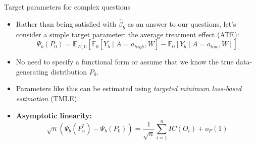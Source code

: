 \documentclass[12pt,t,handout]{beamer}
\begin{document}
\begin{frame}[c]{Target parameters for complex questions}

\begin{center}
\begin{itemize}
  \itemsep12pt
  \item Rather than being satisfied with $\hat{\beta}_{b}$ as an answer to our
    questions, let's consider a simple target parameter: the average treatment
    effect (ATE):
    \[
      \Psi_b(P_0) = \mathbb{E}_{W,0}[\mathbb{E}_0[Y_b \mid A = a_{high}, W] -
      \mathbb{E}_0[Y_b \mid A = a_{low}, W]]
    \]
  \item No need to specify a functional form or assume that we know the true
    data-generating distribution $P_0$.
  \item Parameters like this can be estimated using \textit{targeted minimum
    loss-based estimation} (TMLE).
  \item \textbf{Asymptotic linearity:}
    \[
      \sqrt{n}(\Psi_b(P_n^*) - \Psi_b(P_0)) = \frac{1}{\sqrt{n}}
      \sum_{i = 1}^{n} IC(O_i) + o_P(1)
    \]
\end{itemize}
\end{center}

\end{frame}
\end{document}
